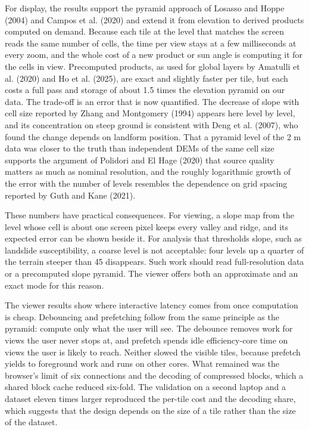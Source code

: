 \documentclass[10pt,a4paper]{article}
\begin{document}
For display, the results support the pyramid approach of Losasso and Hoppe (2004) and Campos et al. (2020) and extend it from elevation to derived products computed on demand. Because each tile at the level that matches the screen reads the same number of cells, the time per view stays at a few milliseconds at every zoom, and the whole cost of a new product or sun angle is computing it for the cells in view. Precomputed products, as used for global layers by Amatulli et al. (2020) and Ho et al. (2025), are exact and slightly faster per tile, but each costs a full pass and storage of about 1.5 times the elevation pyramid on our data. The trade-off is an error that is now quantified. The decrease of slope with cell size reported by Zhang and Montgomery (1994) appears here level by level, and its concentration on steep ground is consistent with Deng et al. (2007), who found the change depends on landform position. That a pyramid level of the 2 m data was closer to the truth than independent DEMs of the same cell size supports the argument of Polidori and El Hage (2020) that source quality matters as much as nominal resolution, and the roughly logarithmic growth of the error with the number of levels resembles the dependence on grid spacing reported by Guth and Kane (2021).

These numbers have practical consequences. For viewing, a slope map from the level whose cell is about one screen pixel keeps every valley and ridge, and its expected error can be shown beside it. For analysis that thresholds slope, such as landslide susceptibility, a coarse level is not acceptable: four levels up a quarter of the terrain steeper than 45\textdegree{} disappears. Such work should read full-resolution data or a precomputed slope pyramid. The viewer offers both an approximate and an exact mode for this reason.

The viewer results show where interactive latency comes from once computation is cheap. Debouncing and prefetching follow from the same principle as the pyramid: compute only what the user will see. The debounce removes work for views the user never stops at, and prefetch spends idle efficiency-core time on views the user is likely to reach. Neither slowed the visible tiles, because prefetch yields to foreground work and runs on other cores. What remained was the browser's limit of six connections and the decoding of compressed blocks, which a shared block cache reduced six-fold. The validation on a second laptop and a dataset eleven times larger reproduced the per-tile cost and the decoding share, which suggests that the design depends on the size of a tile rather than the size of the dataset.
\end{document}
